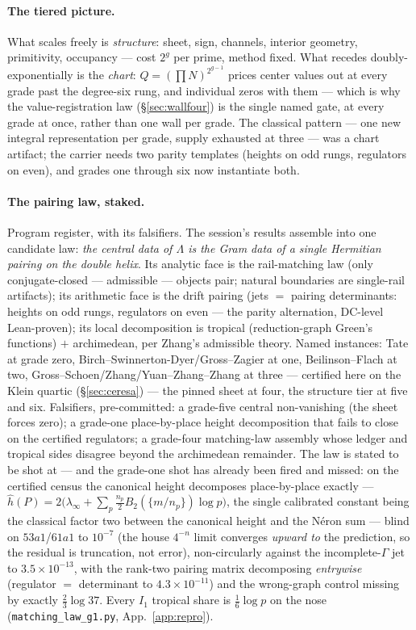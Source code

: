 \documentclass[11pt]{article}
\theoremstyle{definition}
\theoremstyle{remark}
\begin{document}
\paragraph{The tiered picture.} What scales freely is \emph{structure}: sheet,
sign, channels, interior geometry, primitivity, occupancy --- cost
$2^g$ per prime, method fixed. What recedes doubly-exponentially is the
\emph{chart}: $Q=(\prod N)^{2^{g-1}}$ prices center values out at every grade
past the degree-six rung, and individual zeros with them --- which is why the
value-registration law (\S\ref{sec:wallfour}) is the single named gate, at
every grade at once, rather than one wall per grade. The classical pattern
--- one new integral representation per grade, supply exhausted at three ---
was a chart artifact; the carrier needs two parity templates (heights on odd
rungs, regulators on even), and grades one through six now instantiate both.

\paragraph{The pairing law, staked.} Program register, with its falsifiers.
The session's results assemble into one candidate law: \emph{the central data
of $\Lambda$ is the Gram data of a single Hermitian pairing on the double
helix}. Its analytic face is the rail-matching law (only conjugate-closed ---
admissible --- objects pair; natural boundaries are single-rail artifacts);
its arithmetic face is the drift pairing (jets $=$ pairing determinants:
heights on odd rungs, regulators on even --- the parity alternation, DC-level
Lean-proven); its local decomposition is tropical (reduction-graph Green's
functions) $+$ archimedean, per Zhang's admissible theory. Named instances:
Tate at grade zero, Birch--Swinnerton-Dyer/Gross--Zagier at one,
Beilinson--Flach at two, Gross--Schoen/Zhang/Yuan--Zhang--Zhang at three ---
certified here on the Klein quartic (\S\ref{sec:ceresa}) --- the pinned sheet
at four, the structure tier at five and six. Falsifiers, pre-committed: a
grade-five central non-vanishing (the sheet forces zero); a grade-one
place-by-place height decomposition that fails to close on the certified
regulators; a grade-four matching-law assembly whose ledger and tropical
sides disagree beyond the archimedean remainder. The law is stated to be
shot at --- and the grade-one shot has already been fired and missed: on the
certified census the canonical height decomposes place-by-place exactly ---
$\hat h(P)=2\bigl(\lambda_\infty+\sum_p\tfrac{n_p}{2}
B_2(\{m/n_p\})\log p\bigr)$, the single calibrated constant being the
classical factor two between the canonical height and the N\'eron sum ---
blind on $53a1$/$61a1$ to $10^{-7}$ (the house $4^{-n}$ limit converges
\emph{upward to} the prediction, so the residual is truncation, not error),
non-circularly against the incomplete-$\Gamma$ jet to $3.5\times10^{-13}$,
with the rank-two pairing matrix decomposing \emph{entrywise} (regulator
$=$ determinant to $4.3\times10^{-11}$) and the wrong-graph control missing
by exactly $\tfrac23\log37$. Every $I_1$ tropical share is $\tfrac16\log p$
on the nose (\texttt{matching\_law\_g1.py}, App.~\ref{app:repro}).
\end{document}
